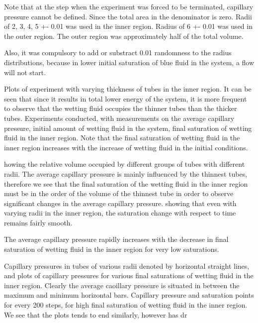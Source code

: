 \documentclass[
	12pt
] {article}
\begin{document}
	Note that at the step when the experiment was forced to be terminated, capillary pressure cannot be defined. Since the total area in the denominator is zero. Radii of {2, 3, 4, 5} +- 0.01 was used in the inner region. Radius of 6 +- 0.01 was used in the outer region. The outer region was approximately half of the total volume.
	
	Also, it was compulsory to add or substract 0.01 randomness to the radius distributions, because in lower initial saturation of blue fluid in the system, a flow will not start.
	
	Plots of experiment with varying thickness of tubes in the inner region. It can be seen that since it results in total lower energy of the system, it is more frequent to observe that the wetting fluid occupies the thinner tubes than the thicker tubes.
	Experiments conducted, with measurements on the average capillary pressure, initial amount of wetting fluid in the system, final saturation of wetting fluid in the inner region. Note that the final saturation of wetting fluid in the inner region increases with the increase of wetting fluid in the initial conditions.
					
	howing the relative volume occupied by different groups of tubes with different radii. The average capillary pressure is mainly influenced by the thinnest tubes, therefore we see that the final saturation of the wetting fluid in the inner region must be in the order of the volume of the thinnest tube in order to observe significant changes in the average capillary pressure. 
	showing that even with varying radii in the inner region, the saturation change with respect to time remains fairly smooth.
				
	The average capillary pressure rapidly increases with the decrease in final saturation of wetting fluid in the inner region for very low saturations.

	Capillary pressures in tubes of various radii denoted by horizontal straight lines, and plots of capillary pressures for various final saturations of wetting fluid in the inner region. Clearly the average caoillary pressure is situated in between the maximum and minimum horizontal bars.
	Capillary pressure and saturation points for every 200 steps, for high final saturation of wetting fluid in the inner region. We see that the plots tends to end similarly, however has dr
	
\end{document}
